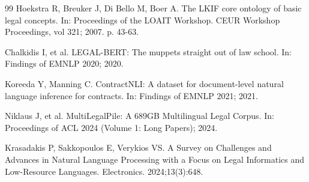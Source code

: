 \documentclass{IOS-Book-Article}
\begin{document}
\begin{thebibliography}{99}
Hoekstra R, Breuker J, Di Bello M, Boer A. The LKIF core ontology of basic legal concepts. In:
Proceedings of the LOAIT Workshop. CEUR Workshop Proceedings, vol 321; 2007. p. 43-63.

Chalkidis I, et al. LEGAL-BERT: The muppets straight out of law school. In: Findings of
EMNLP 2020; 2020.

Koreeda Y, Manning C. ContractNLI: A dataset for document-level natural language inference
for contracts. In: Findings of EMNLP 2021; 2021.

Niklaus J, et al. MultiLegalPile: A 689GB Multilingual Legal Corpus. In: Proceedings of ACL
2024 (Volume 1: Long Papers); 2024.

Krasadakis P, Sakkopoulos E, Verykios VS. A Survey on Challenges and Advances in Natural
Language Processing with a Focus on Legal Informatics and Low-Resource Languages.
Electronics. 2024;13(3):648.

\end{thebibliography}
\end{document}
